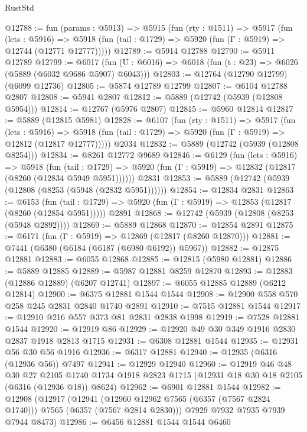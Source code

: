 \begin{lexlean}{RustStd}
\begin{coremodule}
@12788 := fun (params : @5913) =>
  @5915
    (fun (rty : @1511) =>
    @5917
      (fun (lets : @5916) =>
      @5918 (fun (tail : @1729) => @5920 (fun (Γ : @5919) => @12744 (@12771 @12777)))))
@12789 := @5914 @12788
@12790 := @5911 @12789
@12799 := @6017
    (fun (U : @6016) => @6018 (fun (t : @23) => @6026 (@5889 (@6032 @9686 @5907) @6043)))
@12803 := @12764 (@12790 @12799) (@6099 @12736)
@12805 := @5874 @12789 @12799
@12807 := @6104 @12788 @2807
@12808 := @5941 @2807
@12812 := @5889 (@12742 (@5939 (@12808 @5954)))
@12814 := @12767 (@5976 @2807)
@12815 := @5960 @12814
@12817 := @5889 (@12815 @5981)
@12828 := @6107
    (fun (rty : @1511) =>
    @5917
      (fun (lets : @5916) =>
      @5918 (fun (tail : @1729) => @5920 (fun (Γ : @5919) => @12812 (@12817 @12777)))))
    @2034
@12832 := @5889 (@12742 (@5939 (@12808 @8254)))
@12834 := @8261 @12772 @9689
@12846 := @6129
    (fun (lets : @5916) =>
    @5918
      (fun (tail : @1729) =>
      @5920 (fun (Γ : @5919) => @12832 (@12817 (@8260 (@12834 @5949 @5951))))))
    @2831
@12853 := @5889 (@12742 (@5939 (@12808 (@8253 (@5948 (@2832 @5951))))))
@12854 := @12834 @2831
@12863 := @6153
    (fun (tail : @1729) => @5920 (fun (Γ : @5919) => @12853 (@12817 (@8260 (@12854 @5951)))))
    @2891
@12868 := @12742 (@5939 (@12808 (@8253 (@5948 @2892))))
@12869 := @5889 @12868
@12870 := @12854 @2891
@12875 := @6171 (fun (Γ : @5919) => @12869 (@12817 (@8260 @12870)))
@12881 := @7441 (@6380 (@6184 (@6187 (@6980 @6192)) @5967))
@12882 := @12875 @12881
@12883 := @6055 @12868
@12885 := @12815 (@5980 @12881)
@12886 := @5889 @12885
@12889 := @5987 @12881 @8259 @12870
@12893 := @12883 (@12886 @12889) (@6207 @12741)
@12897 := @6055 @12885 @12889 (@6212 @12814)
@12900 := @6375 @12881 @1544 @1544
@12908 := @12900 @558 @570 @258 @245 @2831 @2840 @1740 @2891
@12910 := @7515 @12881 @1544
@12917 := @12910 @216 @557 @373 @81 @2831 @2838 @1998
@12919 := @7528 @12881 @1544
@12920 := @12919 @86
@12929 := @12920 @49 @30 @349 @1916 @2830 @2837 @1918 @2813 @1715
@12931 := @6308 @12881 @1544
@12935 := @12931 @56 @30 @56 @1916
@12936 := @6317 @12881
@12940 := @12935 (@6316 (@12936 @56)) @7497
@12941 := @12929 @12940
@12960 := @12919
    @46
    @48
    @30
    @27
    @2105
    @1740
    @1734
    @1918
    @2823
    @1715
    (@12931 @18 @30 @18 @2105 (@6316 (@12936 @18)) @8624)
@12962 := @6901 @12881 @1544
@12982 := @12908
    (@12917
      (@12941 (@12960 @12962 @7565 (@6357 (@7567 @2824 @1740))) @7565 (@6357 (@7567 @2814 @2830)))
      @7929
      @7932
      @7935
      @7939
      @7944
      @8473)
@12986 := @6456 @12881 @1544 @1544 @6460

\end{coremodule}
\end{lexlean}
